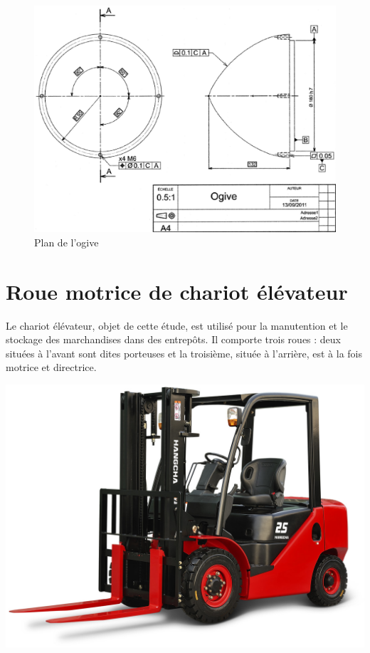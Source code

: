 \begin{figure}[!h]
 \centering\includegraphics[width=\linewidth]{img/Plan_sous_marin.png}
 \caption{Plan de l'ogive}
 \label{plan}
\end{figure}

\newpage

\section{Roue motrice de chariot élévateur}

\begin{minipage}{0.65\linewidth}
Le chariot élévateur, objet de cette étude, est utilisé pour la manutention et le stockage des
marchandises dans des entrepôts. Il comporte trois roues : deux situées à l'avant sont dites porteuses et la troisième, située à l'arrière, est à la fois motrice et directrice.
\end{minipage}\hfill
\begin{minipage}{0.3\linewidth}
\centering \includegraphics[width=0.8\linewidth]{img/XF25}
\end{minipage}

